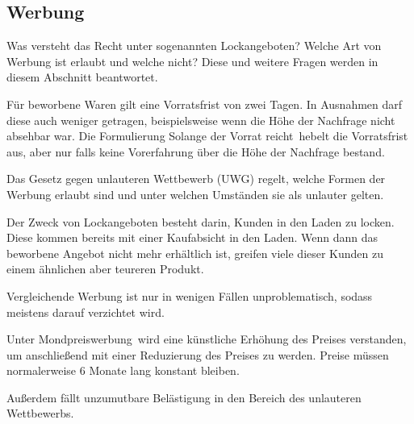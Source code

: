 \subsection{Werbung}

Was versteht das Recht unter sogenannten \ql Lockangeboten\qr? Welche Art von Werbung ist erlaubt und welche nicht? Diese und weitere Fragen werden in diesem Abschnitt beantwortet.

Für beworbene Waren gilt eine Vorratsfrist von zwei Tagen. In Ausnahmen darf diese auch weniger getragen, beispielsweise wenn die Höhe der Nachfrage nicht absehbar war. Die Formulierung \ql Solange der Vorrat reicht\qr\ hebelt die Vorratsfrist aus, aber nur falls keine Vorerfahrung über die Höhe der Nachfrage bestand.

Das Gesetz gegen unlauteren Wettbewerb (UWG) regelt, welche Formen der Werbung erlaubt sind und unter welchen Umständen sie als unlauter gelten.

Der Zweck von Lockangeboten besteht darin, Kunden in den Laden zu locken. Diese kommen bereits mit einer Kaufabsicht in den Laden. Wenn dann das beworbene Angebot nicht mehr erhältlich ist, greifen viele dieser Kunden zu einem ähnlichen aber teureren Produkt. 

Vergleichende Werbung ist nur in wenigen Fällen unproblematisch, sodass meistens darauf verzichtet wird.

Unter \ql Mondpreiswerbung\qr\ wird eine künstliche Erhöhung des Preises verstanden, um anschließend mit einer Reduzierung des Preises zu werden. Preise müssen normalerweise 6 Monate lang konstant bleiben.

Außerdem fällt unzumutbare Belästigung in den Bereich des unlauteren Wettbewerbs.

